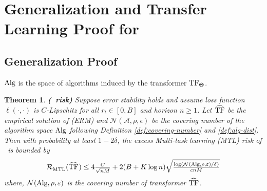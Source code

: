 \documentclass[10pt]{article}
\theoremstyle{plain}
\newtheorem{theorem}{Theorem}[section]
\theoremstyle{definition}
\theoremstyle{remark}
\begin{document}
\section{Generalization and Transfer Learning Proof for \pred}
\label{sec:generalization-app}
\subsection{Generalization Proof}
\label{app:generalization}
$\mathrm{Alg}$ is the space of algorithms induced by the transformer $\mathrm{TF}_{\mathbf{\Theta}}$.
\begin{theorem}
\label{thm:multi-task-risk-app}\textbf{(\pred\ risk)}
    Suppose error stability  holds and assume loss function $\ell(\cdot,\cdot)$ is $C$-Lipschitz for all $r_t \in [0,B]$ and horizon $n\geq 1$. Let $\widehat{\mathrm{TF}}$ be the empirical solution of (ERM) and $\mathcal{N}(\mathcal{A}, \rho, \epsilon)$ be the covering number of the algorithm space $\mathrm{Alg}$ following Definition \ref{def:covering-number} and \ref{def:alg-dist}. Then with probability at least $1-2 \delta$, the excess Multi-task learning (MTL) risk of \predt\ is bounded by
    \begin{align*}
        \mathcal{R}^{}_{\mathrm{MTL}}(\widehat{\mathrm{TF}}_{}) \leq 4 \tfrac{C}{\sqrt{nM}} +2(B+K \log n) \sqrt{\tfrac{\log (\mathcal{N}(\mathrm{Alg}, \rho, \varepsilon) / \delta)}{c n M}}
    \end{align*}
    where, $\mathcal{N}(\mathrm{Alg}, \rho, \varepsilon)$ is the covering number of transformer $\widehat{\mathrm{TF}}_{}$.
\end{theorem}
\end{document}
